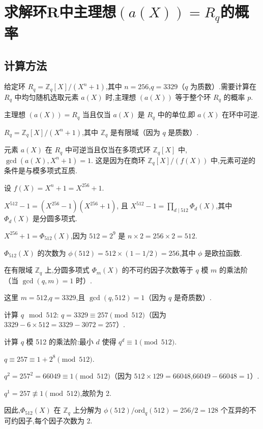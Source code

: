 \documentclass[12pt,a4paper]{article}
\numberwithin{equation}{section}
\begin{document}
\section[求解环R中主理想(a(X))=Rq的概率]{求解环R中主理想$(a(X))=R_q$的概率}
\subsection{计算方法}

给定环 $R_q = \mathbb{Z}_q[X]/(X^n + 1)$,其中 $n = 256$,$q = 3329$（$q$ 为质数）.需要计算在 $R_q$ 中均匀随机选取元素 $a(X)$ 时,主理想 $(a(X))$ 等于整个环 $R_q$ 的概率 $p$.

主理想 $(a(X)) = R_q$ 当且仅当 $a(X)$ 是 $R_q$ 中的单位,即 $a(X)$ 在环中可逆.

$R_q = \mathbb{Z}_q[X]/(X^n + 1)$,其中 $\mathbb{Z}_q$ 是有限域（因为 $q$ 是质数）.

元素 $a(X)$ 在 $R_q$ 中可逆当且仅当在多项式环 $\mathbb{Z}_q[X]$ 中,$\gcd(a(X), X^n + 1) = 1$.
这是因为在商环 $\mathbb{Z}_q[X]/(f(X))$ 中,元素可逆的条件是与模多项式互质.

设 $f(X) = X^n + 1 = X^{256} + 1$.

$X^{512} - 1 = (X^{256} - 1)(X^{256} + 1)$,
且 $X^{512} - 1 = \prod_{d \mid 512} \Phi_d(X)$,其中 $\Phi_d(X)$ 是分圆多项式.

$X^{256} + 1 = \Phi_{512}(X)$,因为 $512 = 2^9$ 是 $n \times 2 = 256 \times 2 = 512$.

$\Phi_{512}(X)$ 的次数为 $\phi(512) = 512 \times (1 - 1/2) = 256$,其中 $\phi$ 是欧拉函数.

在有限域 $\mathbb{Z}_q$ 上,分圆多项式 $\Phi_m(X)$ 的不可约因子次数等于 $q$ 模 $m$ 的乘法阶（当 $\gcd(q, m) = 1$ 时）.

这里 $m = 512$,$q = 3329$,且 $\gcd(q, 512) = 1$（因为 $q$ 是奇质数）.

计算 $q \mod 512$: $q = 3329 \equiv 257 \pmod{512}$（因为 $3329 - 6 \times 512 = 3329 - 3072 = 257$）.

计算 $q$ 模 512 的乘法阶:最小 $d$ 使得 $q^d \equiv 1 \pmod{512}$.

$q \equiv 257 \equiv 1 + 2^8 \pmod{512}$.

$q^2 = 257^2 = 66049 \equiv 1 \pmod{512}$（因为 $512 \times 129 = 66048$,$66049 - 66048 = 1$）.

$q^1 = 257 \not\equiv 1 \pmod{512}$,故阶为 2.

因此,$\Phi_{512}(X)$ 在 $\mathbb{Z}_q$ 上分解为 $\phi(512) / \text{ord}_q(512) = 256 / 2 = 128$ 个互异的不可约因子,每个因子次数为 2.
\end{document}

